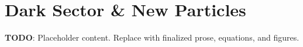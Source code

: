 
\section{Dark Sector \& New Particles}
\label{sec:dark-sector-new-particles}

\textbf{TODO}: Placeholder content. Replace with finalized prose, equations, and figures.

